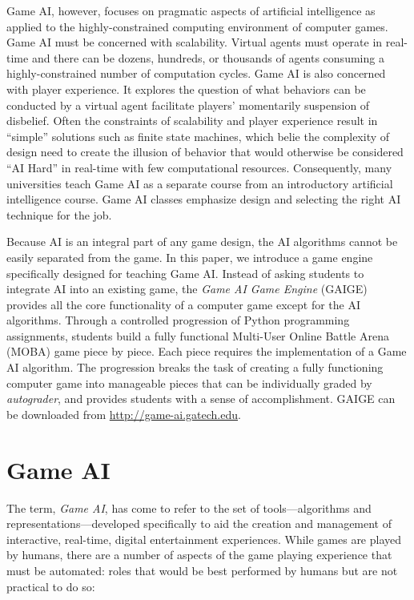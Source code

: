 \documentclass[letterpaper]{article}
\begin{document}
Game AI, however, focuses on pragmatic aspects of artificial intelligence as applied to the highly-constrained computing environment of computer games.
Game AI must be concerned with scalability. Virtual agents must operate in real-time and there can be dozens, hundreds, or thousands of agents consuming a highly-constrained number of computation cycles.
Game AI is also concerned with player experience. It explores the question of what behaviors can be conducted by a virtual agent facilitate players' momentarily suspension of disbelief.
Often the constraints of scalability and player experience result in ``simple'' solutions such as finite state machines, which belie the complexity of design need to create the illusion of behavior that would otherwise be considered ``AI Hard'' in real-time with few computational resources.
Consequently, many universities teach Game AI as a separate course from an introductory artificial intelligence course.
Game AI classes emphasize design and selecting the right AI technique for the job.

Because AI is an integral part of any game design, the AI algorithms cannot be easily separated from the game.
In this paper, we introduce a game engine specifically designed for teaching Game AI.
Instead of asking students to integrate AI into an existing game, the {\em Game AI Game Engine} (GAIGE) provides all the core functionality of a computer game except for the AI algorithms.
Through a controlled progression of Python programming assignments, students build a fully functional Multi-User Online Battle Arena (MOBA) game piece by piece.
Each piece requires the implementation of a Game AI algorithm.
The progression breaks the task of creating a fully functioning computer game into manageable pieces that can be individually graded by {\em autograder}, and provides students with a sense of accomplishment.
GAIGE can be downloaded from \url{http://game-ai.gatech.edu}.
 


\section{Game AI}

The term, {\em Game AI}, has come to refer to the set of tools---algorithms and representations---developed specifically to aid the creation and management of interactive, real-time, digital entertainment experiences. 
While games are played by humans, there are a number of aspects of the game playing experience that must be automated: roles that would be best performed by humans but are not practical to do so:
\end{document}
